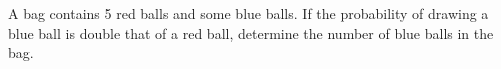 A bag contains 5 red balls and some blue balls. If the probability of drawing a blue ball is double that of a red ball, determine the number of blue balls in the bag.